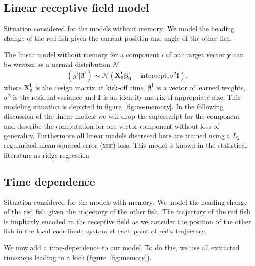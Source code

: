 \documentclass[nobib, a4paper]{tufte-handout}
\begin{document}
\subsection{Linear receptive field model}
\begin{marginfigure}
 \caption{Situation considered for the models without memory:
 We model the heading change of the red fish given the current position and angle of the other fish.}
\label{fig:no-memory}
\end{marginfigure}

The linear model without memory for a component \(i\) of our target vector \(\bm{y}\) can be written as a normal distribution \(\mathcal{N}\)
\begin{equation*}
 \left( y^i | \bm{\beta}^{i} \right)  \sim \mathcal{N} \left( \bm{X^i_0} \bm{\beta^i_0} + \text{intercept}, \sigma^2 \bm{I}  \right),
\end{equation*}
where \(\bm{X^i_0}\) is the design matrix at kick-off time, \(\bm{\beta^i}\) is a vector of learned weights, \(\sigma^2\) is the residual variance and \(\bm{I}\) is an identity matrix of appropriate size.
This modeling situation is depicted in figure~\ref{fig:no-memory}.
In the following discussion of the linear models we will drop the superscript for the component and describe the computation for one vector component without loss of generality.
Furthermore all linear models discussed here are trained using a $L_2$ regularized mean squared error (\textsc{mse}) loss.
This model is known in the statistical literature as ridge regression.

\subsection{Time dependence}
\begin{marginfigure}[2cm]
 \caption{Situation considered for the models with memory:
   We model the heading change of the red fish given the trajectory of the other fish.
 The trajectory of the red fish is implicitly encoded in the receptive field as we consider the position of the other fish in the local coordinate system at each point of red's trajectory.}
\label{fig:memory}
\end{marginfigure}
We now add a time-dependence to our model.
To do this, we use all extracted timesteps leading to a kick (figure~\ref{fig:memory}).
\end{document}
